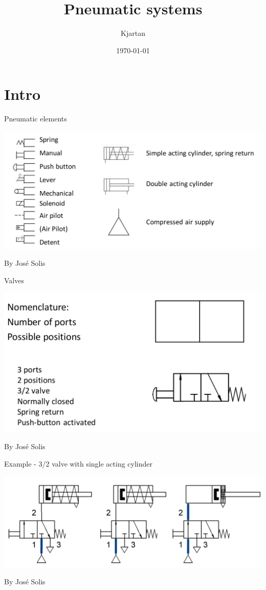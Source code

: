 \documentclass[presentation,aspectratio=1610]{beamer}
\author{Kjartan}
\date{\today}
\title{Pneumatic systems}
\begin{document}
\maketitle

\section{Intro}
\label{sec:org51761b9}
\begin{frame}[label={sec:org55b9051}]{Pneumatic elements}
\begin{center}
\includegraphics[width=\linewidth]{../../figures/actuation-symbols.png}
\end{center}
{\tiny By José Solis}
\end{frame}
\begin{frame}[label={sec:orge99b4e0}]{Valves}
\begin{center}
\includegraphics[width=\linewidth]{../../figures/valves-32.png}
\end{center}
{\tiny By José Solis}
\end{frame}
\begin{frame}[label={sec:org6f5ae75}]{Example - 3/2 valve with single acting cylinder}
\begin{center}
\includegraphics[width=\linewidth]{../../figures/valve-32-example.png}
\end{center}
{\tiny By José Solis}
\end{frame}
\end{document}
